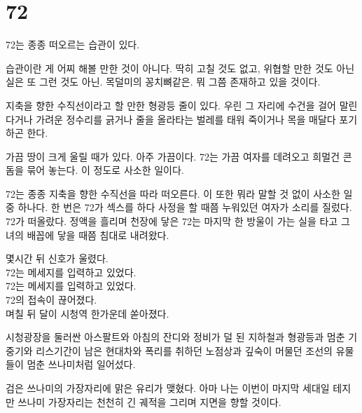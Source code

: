 \hypertarget{section}{%

\chapter{72}\label{section}}



72는 종종 떠오르는 습관이 있다.



습관이란 게 어찌 해볼 만한 것이 아니다. 딱히 고칠 것도 없고, 위협할 만한 것도 아닌 실은 또 그런 것도 아닌. 목덜미의 꽁치뼈같은. 뭐 그쯤 존재하고 있을 것이다.



지축을 향한 수직선이라고 할 만한 형광등 줄이 있다. 우린 그 자리에 수건을 걸어 말린 다거나 가려운 정수리를 긁거나 줄을 올라타는 벌레를 태워 죽이거나 목을 매달다 포기하곤 한다.



가끔 땅이 크게 울릴 때가 있다. 아주 가끔이다. 72는 가끔 여자를 데려오고 희멀건 콘돔을 묶어 놓는다. 이 정도로 사소한 일이다.



72는 종종 지축을 향한 수직선을 따라 떠오른다. 이 또한 뭐라 말할 것 없이 사소한 일 중 하나다. 한 번은 72가 섹스를 하다 사정을 할 때쯤 누워있던 여자가 소리를 질렀다. 72가 떠올랐다. 정액을 흘리며 천장에 닿은 72는 마지막 한 방울이 가는 실을 타고 그녀의 배꼽에 닿을 때쯤 침대로 내려왔다.



몇시간 뒤 신호가 울렸다.\\

72는 메세지를 입력하고 있었다.\\

72는 메세지를 입력하고 있었다.\\

72의 접속이 끊어졌다.\\

며칠 뒤 달이 시청역 한가운데 쏟아졌다.



시청광장을 둘러싼 아스팔트와 아침의 잔디와 정비가 덜 된 지하철과 형광등과 멈춘 기중기와 리스기간이 남은 현대차와 폭리를 취하던 노점상과 깊숙이 머물던 조선의 유물들이 멈춘 쓰나미처럼 일어섰다.



검은 쓰나미의 가장자리에 맑은 유리가 맺혔다. 아마 나는 이번이 마지막 세대일 테지만 쓰나미 가장자리는 천천히 긴 궤적을 그리며 지면을 향할 것이다.

